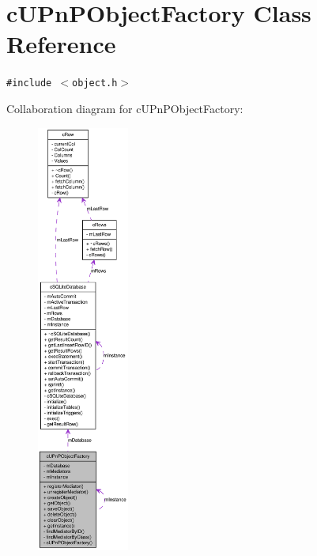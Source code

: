 \hypertarget{classcUPnPObjectFactory}{
\section{cUPnPObjectFactory Class Reference}
\label{classcUPnPObjectFactory}
}
{\tt \#include $<$object.h$>$}

Collaboration diagram for cUPnPObjectFactory:\nopagebreak
\begin{figure}[H]
\begin{center}
\leavevmode
\includegraphics[height=400pt]{classcUPnPObjectFactory__coll__graph}
\end{center}
\end{figure}
